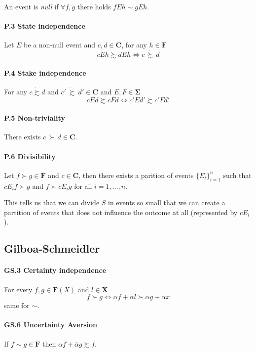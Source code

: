 \documentclass[landscape, 12pt]{extarticle}
\newcommand{\dsuccsim}{\ \dot \succsim \ }
\begin{document}
\begin{multicols}{2}
	An event is \textit{null} if $\forall f, g$ there holds $fEh \sim gEh$.

	\paragraph{P.3 State independence}
	Let $E$ be a non-null event and $c, d \in \bm C$, for any $h \in \bm F$
	\[
		cEh \succsim dEh \iff c\, \dot \succsim \, d
	\]

	\paragraph{P.4 Stake independence}
	For any $c \dot \succsim d$ and $c' \dsuccsim d' \in \bm C$
	and $E, F \in \bm \Sigma$
	\[
		cEd \succsim cFd \iff c'Ed'\succsim c'Fd'
	\]

	\paragraph{P.5 Non-triviality}
	There exists $c \, \dot \succ \, d \in \bm C$.

	\paragraph{P.6 Divisibility}
	Let $f \succ g \in \bm F$ and $c \in \bm C$,
	then there exists a parition of events $\{E_i\}^n_{i=1}$
	such that $cE_if \succ g$ and $f \succ cE_ig$ for all $i=1,\dots,n$.

	This tells us that we can divide $S$ in events so small that we can create
	a partition of events that does not influence the outcome at all (represented by $cE_i$).

	\subsection{Gilboa-Schmeidler}
	\paragraph{GS.3 Certainty independence}
	For every $f, g \in \bm F(X)$ and $l \in \bm X$
	\[
		f \succ g \iff \alpha f + \overline \alpha l \succ \alpha g + \overline \alpha x
	\]
	same for $\sim$.

	\paragraph{GS.6 Uncertainty Aversion}
	If $f \sim g \in \bm F$ then $\alpha f + \overline \alpha g \succsim f$.

\end{multicols}
\end{document}

